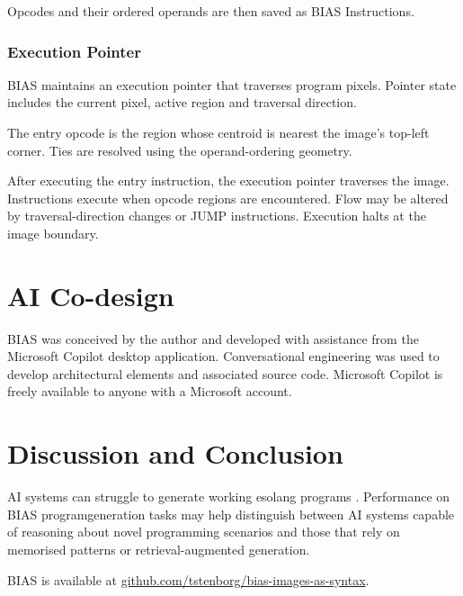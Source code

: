 \documentclass[11pt,twoside]{article}
\begin{document}
Opcodes and their ordered operands are then saved as BIAS Instructions.

\subsubsection{Execution Pointer}
BIAS maintains an execution pointer that traverses program pixels. Pointer state includes the current pixel, active region and traversal direction.

The entry opcode is the region whose centroid is nearest the image's top-left corner. Ties are resolved using the operand-ordering geometry.

After executing the entry instruction, the execution pointer traverses the image. Instructions execute when opcode regions are encountered. Flow may be altered by traversal-direction changes or JUMP instructions. Execution halts at the image boundary.

\section{AI Co-design}
BIAS was conceived by the author and developed with assistance from the Microsoft Copilot desktop application. Conversational engineering was used to develop architectural elements and associated source code. Microsoft Copilot is freely available to anyone with a Microsoft account.

\section{Discussion and Conclusion}
AI systems can struggle to generate working esolang programs \citep{2025Onwrdconf..213S}. Performance on BIAS programgeneration
tasks may help distinguish between AI systems capable of reasoning about novel programming scenarios and those that rely on memorised patterns or retrieval-augmented generation.

BIAS is available at \url{github.com/tstenborg/bias-images-as-syntax}.




\end{document}
